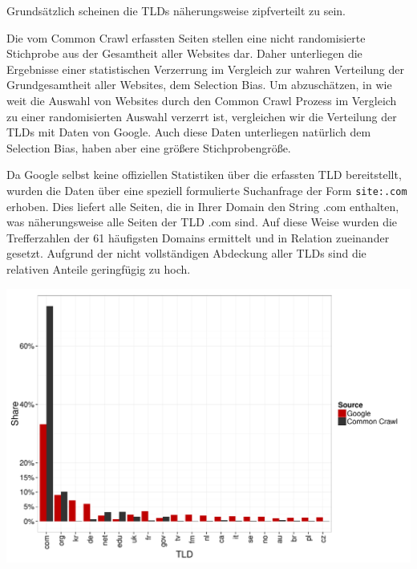 \documentclass[a4paper,12pt,titlepage=false]{scrreprt}
\begin{document}
Grundsätzlich scheinen die TLDs näherungsweise zipfverteilt zu sein.

\clearpage

\begin{figure}
    \label{wrap-fig:3}
    \def\svgwidth{.45\textwidth}
    
\end{figure}

Die vom Common Crawl erfassten Seiten stellen eine nicht randomisierte Stichprobe aus der Gesamtheit aller Websites dar. Daher unterliegen die Ergebnisse einer statistischen Verzerrung im Vergleich zur wahren Verteilung der Grundgesamtheit aller Websites, dem Selection Bias. Um abzuschätzen, in wie weit die Auswahl von Websites durch den Common Crawl Prozess im Vergleich zu einer randomisierten Auswahl verzerrt ist, vergleichen wir die Verteilung der TLDs mit Daten von Google. Auch diese Daten unterliegen natürlich dem Selection Bias, haben aber eine größere Stichprobengröße.

Da Google selbst keine offiziellen Statistiken über die erfassten TLD bereitstellt, wurden die Daten über eine speziell formulierte Suchanfrage der Form \texttt{site:.com} erhoben. Dies liefert alle Seiten, die in Ihrer Domain den String .com enthalten, was näherungsweise alle Seiten der TLD .com sind. Auf diese Weise wurden die Trefferzahlen der 61 häufigsten Domains ermittelt und in Relation zueinander gesetzt. Aufgrund der nicht vollständigen Abdeckung aller TLDs sind die relativen Anteile geringfügig zu hoch.

\begin{center}
    \includegraphics[width=.9\textwidth]{plots/plot_tld_comparison}
\end{center}
\end{document}
